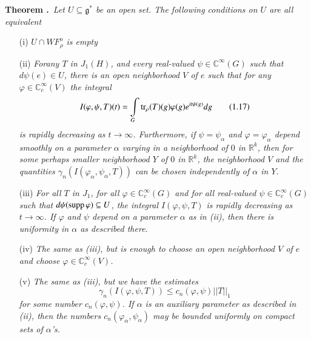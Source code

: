 \medskip
\noindent
{\bf Theorem .\label{art3-thm1.4}}~{\em Let $U\subseteq \mathfrak{g}^{*}$ be an open set. The following conditions on $U$ are all equivalent}
\begin{itemize}
\itemsep=0pt
\item[(i)] {\em $U\cap WF^{o}_{\rho}$ is empty}

\item[(ii)] {\em For\pageoriginale any $T$ in $J_{1}(H)$, and every real-valued $\psi\in \mathbb{C}^{\infty}(G)$ such that $d\psi(e)\in U$, there is an open neighborhood $V$ of $e$ such that for any $\varphi\in \mathbb{C}^{\infty}_{c}(V)$ the integral}
\begin{equation*}
I(\varphi,\psi,T)(t)=\int\limits_{G}\operatorname{tr}_{\rho}(T)(g)\varphi(g)e^{it\psi(g)}dg\tag{1.17}\label{art3-eq1.17}
\end{equation*}
{\em is rapidly decreasing as $t\to \infty$. Furthermore, if $\psi=\psi_{\alpha}$ and $\varphi=\varphi_{\alpha}$ depend smoothly on a parameter $\alpha$ varying in a neighborhood of $0$ in $\mathbb{R}^{k}$, then for some perhaps smaller neighborhood $Y$ of $0$ in $\mathbb{R}^{k}$, the neighborhood $V$ and the quantities $\gamma_{n}(I(\varphi_{\alpha},\psi_{\alpha},T))$ can be chosen independently of $\alpha$ in $Y$.}

\item[(iii)] {\em For all $T$ in $J_{1}$, for all $\varphi \in \mathbb{C}^{\infty}_{c}(G)$ and for all real-valued $\psi\in \mathbb{C}^{\infty}_{c}(G)$ such that $d\psi(\operatorname{supp} \varphi)\subseteq U$, the integral $I(\varphi,\psi,T)$ is rapidly decreasing as $t\to \infty$. If $\varphi$ and $\psi$ depend on a parameter $\alpha$ as in {\rm(ii)}, then there is uniformity in $\alpha$ as described there.}

\item[(iv)] {\em The same as {\em(iii)}, but is enough to choose an open neighborhood $V$ of $e$ and choose $\varphi\in \mathbb{C}^{\infty}_{c}(V)$.}

\item[(v)] {\em The same as {\em(iii)}, but we have the estimates}
\begin{equation*}
\gamma_{n}(I(\varphi,\psi,T))\leq c_{n}(\varphi,\psi)||T||_{1}\tag{1.18}\label{art3-eq1.18}
\end{equation*}
{\em for some number $c_{n}(\varphi,\psi)$. If $\alpha$ is an auxiliary parameter as described in {\em(ii)}, then the numbers $c_{n}(\varphi_{\alpha},\psi_{\alpha})$ may be bounded uniformly on compact sets of $\alpha$'s.}


\end{itemize}
